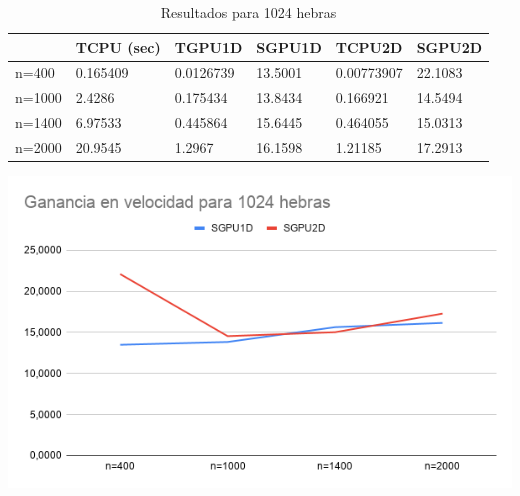 \begin{table}[H]
	\centering
	\begin{tabular}{|l|l|l|l|l|l|}
		\hline
		& \cellcolor[HTML]{ECF4FF}TCPU (sec) & \cellcolor[HTML]{ECF4FF}TGPU1D & \cellcolor[HTML]{ECF4FF}SGPU1D & \cellcolor[HTML]{ECF4FF}TCPU2D & \cellcolor[HTML]{ECF4FF}SGPU2D \\ \hline
		\cellcolor[HTML]{FFFFC7}n=400  & 0.165409                           & 0.0126739                      & 13.5001                        & 0.00773907                     & 22.1083                        \\ \hline
		\cellcolor[HTML]{FFFFC7}n=1000 & 2.4286                             & 0.175434                       & 13.8434                        & 0.166921                       & 14.5494                        \\ \hline
		\cellcolor[HTML]{FFFFC7}n=1400 & 6.97533                            & 0.445864                       & 15.6445                        & 0.464055                       & 15.0313                        \\ \hline
		\cellcolor[HTML]{FFFFC7}n=2000 & 20.9545                            & 1.2967                         & 16.1598                        & 1.21185                        & 17.2913                        \\ \hline
	\end{tabular}
	\caption{Resultados para 1024 hebras}
\end{table}

\begin{center}
	\includegraphics[scale=0.5]{img/g1024}
\end{center}

